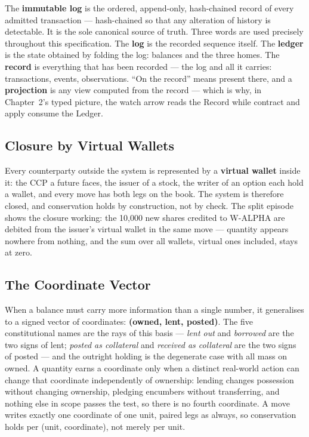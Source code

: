 The \textbf{immutable log} is the ordered, append-only, hash-chained record of every
admitted transaction --- hash-chained so that any alteration of history is detectable.
It is the sole canonical source of truth. Three words are used precisely throughout this
specification. The \textbf{log} is the recorded sequence itself. The \textbf{ledger} is
the state obtained by folding the log: balances and the three homes. The \textbf{record}
is everything that has been recorded --- the log and all it carries: transactions,
events, observations. ``On the record'' means present there, and a \textbf{projection}
is any view computed from the record --- which is why, in Chapter~2's typed picture, the
watch arrow reads the Record while contract and apply consume the Ledger.

\subsection{Closure by Virtual Wallets}

Every counterparty outside the system is represented by a \textbf{virtual wallet} inside
it: the CCP a future faces, the issuer of a stock, the writer of an option each hold a
wallet, and every move has both legs on the book. The system is therefore closed, and
conservation holds by construction, not by check. The split episode shows the closure
working: the 10{,}000 new shares credited to W-ALPHA are debited from the issuer's
virtual wallet in the same move --- quantity appears nowhere from nothing, and the sum
over all wallets, virtual ones included, stays at zero.

\subsection{The Coordinate Vector}

When a balance must carry more information than a single number, it generalises to a
signed vector of coordinates: \textbf{(owned, lent, posted)}. The five constitutional
names are the rays of this basis --- \emph{lent out} and \emph{borrowed} are the two
signs of lent; \emph{posted as collateral} and \emph{received as collateral} are the two
signs of posted --- and the outright holding is the degenerate case with all mass on
owned. A quantity earns a coordinate only when a distinct real-world action can change
that coordinate independently of ownership: lending changes possession without changing
ownership, pledging encumbers without transferring, and nothing else in scope passes the
test, so there is no fourth coordinate. A move writes exactly one coordinate of one
unit, paired legs as always, so conservation holds per (unit, coordinate), not merely
per unit.

